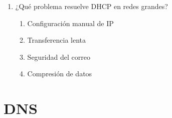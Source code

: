 \documentclass[12pt]{article}
\begin{document}
\begin{enumerate}[label=\textbf{DHCP-\arabic*.}]
\item ¿Qué problema resuelve DHCP en redes grandes?
\begin{enumerate}[label=\alph*)]
\item Configuración manual de IP
\item Transferencia lenta
\item Seguridad del correo
\item Compresión de datos
\end{enumerate}

\end{enumerate}

\section*{DNS}
\end{document}
